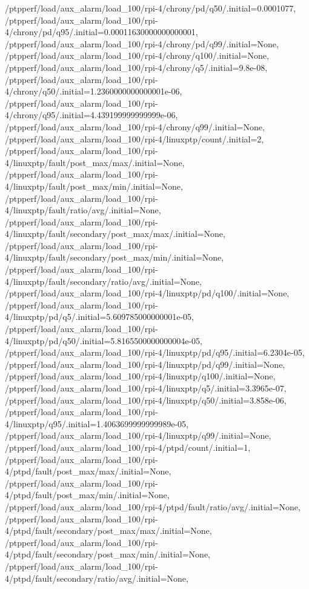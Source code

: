{    /ptpperf/load/aux_alarm/load_100/rpi-4/chrony/pd/q50/.initial=0.0001077,
    /ptpperf/load/aux_alarm/load_100/rpi-4/chrony/pd/q95/.initial=0.00011630000000000001,
    /ptpperf/load/aux_alarm/load_100/rpi-4/chrony/pd/q99/.initial=None,
    /ptpperf/load/aux_alarm/load_100/rpi-4/chrony/q100/.initial=None,
    /ptpperf/load/aux_alarm/load_100/rpi-4/chrony/q5/.initial=9.8e-08,
    /ptpperf/load/aux_alarm/load_100/rpi-4/chrony/q50/.initial=1.2360000000000001e-06,
    /ptpperf/load/aux_alarm/load_100/rpi-4/chrony/q95/.initial=4.439199999999999e-06,
    /ptpperf/load/aux_alarm/load_100/rpi-4/chrony/q99/.initial=None,
    /ptpperf/load/aux_alarm/load_100/rpi-4/linuxptp/count/.initial=2,
    /ptpperf/load/aux_alarm/load_100/rpi-4/linuxptp/fault/post_max/max/.initial=None,
    /ptpperf/load/aux_alarm/load_100/rpi-4/linuxptp/fault/post_max/min/.initial=None,
    /ptpperf/load/aux_alarm/load_100/rpi-4/linuxptp/fault/ratio/avg/.initial=None,
    /ptpperf/load/aux_alarm/load_100/rpi-4/linuxptp/fault/secondary/post_max/max/.initial=None,
    /ptpperf/load/aux_alarm/load_100/rpi-4/linuxptp/fault/secondary/post_max/min/.initial=None,
    /ptpperf/load/aux_alarm/load_100/rpi-4/linuxptp/fault/secondary/ratio/avg/.initial=None,
    /ptpperf/load/aux_alarm/load_100/rpi-4/linuxptp/pd/q100/.initial=None,
    /ptpperf/load/aux_alarm/load_100/rpi-4/linuxptp/pd/q5/.initial=5.609785000000001e-05,
    /ptpperf/load/aux_alarm/load_100/rpi-4/linuxptp/pd/q50/.initial=5.8165500000000004e-05,
    /ptpperf/load/aux_alarm/load_100/rpi-4/linuxptp/pd/q95/.initial=6.2304e-05,
    /ptpperf/load/aux_alarm/load_100/rpi-4/linuxptp/pd/q99/.initial=None,
    /ptpperf/load/aux_alarm/load_100/rpi-4/linuxptp/q100/.initial=None,
    /ptpperf/load/aux_alarm/load_100/rpi-4/linuxptp/q5/.initial=3.3965e-07,
    /ptpperf/load/aux_alarm/load_100/rpi-4/linuxptp/q50/.initial=3.858e-06,
    /ptpperf/load/aux_alarm/load_100/rpi-4/linuxptp/q95/.initial=1.4063699999999989e-05,
    /ptpperf/load/aux_alarm/load_100/rpi-4/linuxptp/q99/.initial=None,
    /ptpperf/load/aux_alarm/load_100/rpi-4/ptpd/count/.initial=1,
    /ptpperf/load/aux_alarm/load_100/rpi-4/ptpd/fault/post_max/max/.initial=None,
    /ptpperf/load/aux_alarm/load_100/rpi-4/ptpd/fault/post_max/min/.initial=None,
    /ptpperf/load/aux_alarm/load_100/rpi-4/ptpd/fault/ratio/avg/.initial=None,
    /ptpperf/load/aux_alarm/load_100/rpi-4/ptpd/fault/secondary/post_max/max/.initial=None,
    /ptpperf/load/aux_alarm/load_100/rpi-4/ptpd/fault/secondary/post_max/min/.initial=None,
    /ptpperf/load/aux_alarm/load_100/rpi-4/ptpd/fault/secondary/ratio/avg/.initial=None,
}
